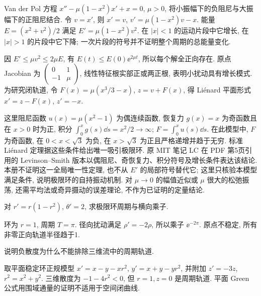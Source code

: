 Van der Pol 方程 $x''-\mu(1-x^2)x'+x=0$, $\mu>0$, 将小振幅下的负阻尼与大振幅下的正阻尼结合. 令 $v=x'$, 则 $x'=v$, $v'=\mu(1-x^2)v-x$. 能量 $E=(x^2+v^2)/2$ 满足 $E'=\mu(1-x^2)v^2$. 在 $|x|<1$ 的运动片段中它增长, 在 $|x|>1$ 的片段中它下降; 一次片段的符号并不证明整个周期的总能量变化.

因 $E'\le\mu v^2\le2\mu E$, 有 $E(t)\le E(0)\ee^{2\mu t}$, 所以每个解全正向存在. 原点 Jacobian 为 $\begin{pmatrix}0&1\\-1&\mu\end{pmatrix}$, 线性特征根实部正或两正根, 表明小扰动具有增长模式. 为研究闭轨道, 令 $F(x)=\mu(x^3/3-x)$, $z=v+F(x)$, 得 Liénard 平面形式 $x'=z-F(x)$, $z'=-x$.

这里阻尼函数 $u(x)=\mu(x^2-1)$ 为偶连续函数, 恢复力 $g(x)=x$ 为奇函数且在 $x>0$ 时为正, 积分 $\int_0^xg(s)\dd s=x^2/2\to\infty$; $F=\int_0^xu(s)\dd s$. 在此模型中, $F$ 为奇函数, 在 $0<x<\sqrt3$ 为负, 在 $x>\sqrt3$ 为正且严格递增并趋于无穷. 标准 Liénard 定理据这些条件给出唯一吸引极限环. 原 MIT 笔记 LC 在 PDF 第5页引用的 Levinson--Smith 版本以偶阻尼、奇恢复力、积分符号及增长条件表达该结论. 本册不证明这一全局唯一性定理, 也不从 $E'$ 的局部符号替代它; 这里只核验本模型满足条件, 说明极限环的自持振动机制. 对 $\mu\to0$ 的幅值近似或 $\mu$ 很大的松弛振荡, 还需平均法或奇异摄动的误差理论, 不作为已证明的定量结论.

\begin{exercise}对 $r'=r(1-r^2)$, $\theta'=2$, 求极限环周期与横向乘子.\end{exercise}
\begin{solution}环为 $r=1$, 周期 $T=\pi$. 径向扰动满足 $\rho'=-2\rho$, 所以乘子 $\ee^{-2\pi}$. 原点不稳定, 所有非零正向轨道半径趋于1.\end{solution}
\begin{exercise}说明负散度为什么不能排除三维流中的周期轨道.\end{exercise}
\begin{solution}取平面稳定环正规模型 $x'=x-y-xr^2$, $y'=x+y-yr^2$, 并附加 $z'=-3z$, $r^2=x^2+y^2$. 三维散度为 $-1-4r^2<0$, 但 $r=1,z=0$ 是周期轨道. 平面 Green 公式用围域通量的证明不适用于空间闭曲线.\end{solution}
